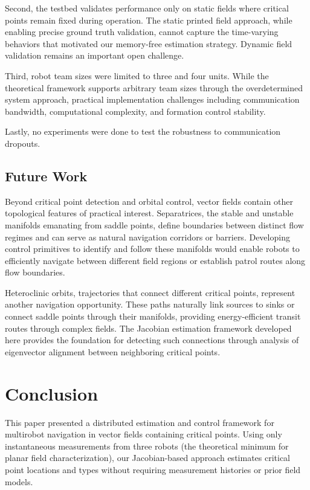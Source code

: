 \documentclass[lettersize,journal]{IEEEtran}
\begin{document}
Second, the testbed validates performance only on static fields where critical points remain fixed during operation. The static printed field approach, while enabling precise ground truth validation, cannot capture the time-varying behaviors that motivated our memory-free estimation strategy. Dynamic field validation remains an important open challenge.

Third, robot team sizes were limited to three and four units. While the theoretical framework supports arbitrary team sizes through the overdetermined system approach, practical implementation challenges including communication bandwidth, computational complexity, and formation control stability.

Lastly, no experiments were done to test the robustness to communication dropouts.

\subsection{Future Work}

Beyond critical point detection and orbital control, vector fields contain other topological features of practical interest. Separatrices, the stable and unstable manifolds emanating from saddle points, define boundaries between distinct flow regimes and can serve as natural navigation corridors or barriers. Developing control primitives to identify and follow these manifolds would enable robots to efficiently navigate between different field regions or establish patrol routes along flow boundaries.

Heteroclinic orbits, trajectories that connect different critical points, represent another navigation opportunity. These paths naturally link sources to sinks or connect saddle points through their manifolds, providing energy-efficient transit routes through complex fields. The Jacobian estimation framework developed here provides the foundation for detecting such connections through analysis of eigenvector alignment between neighboring critical points.


\section{Conclusion}
\noindent 

This paper presented a distributed estimation and control framework for multirobot navigation in vector fields containing critical points. Using only instantaneous measurements from three robots (the theoretical minimum for planar field characterization), our Jacobian-based approach
estimates critical point locations and types without requiring measurement histories or prior field models.
\end{document}
